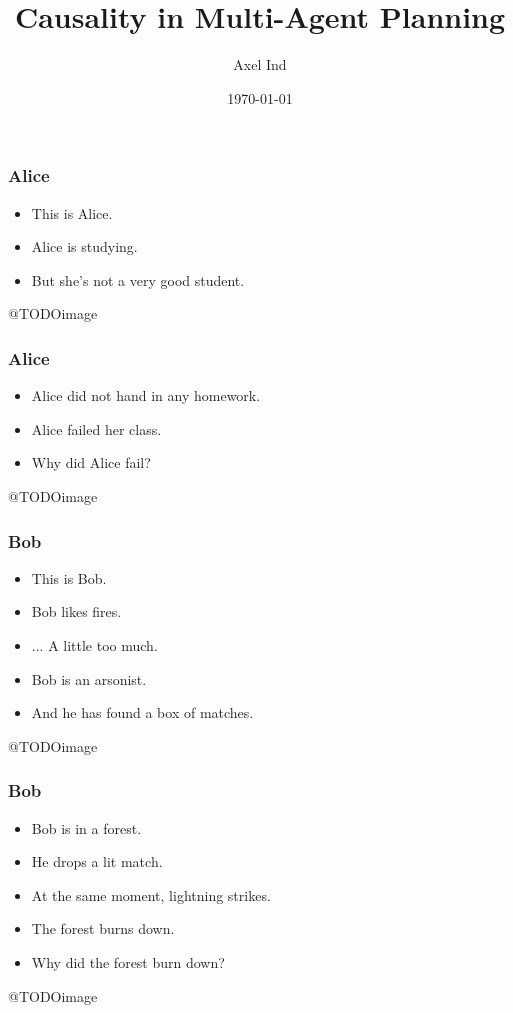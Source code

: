 \documentclass{beamer}
\title{Causality in Multi-Agent Planning}
\author{Axel Ind}
\institute{ALU-Freiburg}
\date{\today}
\theoremstyle{plain}
\theoremstyle{definition}
\begin{document}
 
\frame{\titlepage}

\begin{frame}
\frametitle{Alice}
\begin{itemize}
\item This is Alice.
\item Alice is studying.
\item But she's not a very good student.
\end{itemize}

@TODOimage

\end{frame}



\begin{frame}
\frametitle{Alice}
\begin{itemize}
\item Alice did not hand in any homework.
\item Alice failed her class.
\item Why did Alice fail?
\end{itemize}

@TODOimage

\end{frame}


\begin{frame}
\frametitle{Bob}
\begin{itemize}
\item This is Bob.
\item Bob likes fires.
\item ... A little too much.
\item Bob is an arsonist.
\item And he has found a box of matches.
\end{itemize}

@TODOimage
\end{frame}


\begin{frame}
\frametitle{Bob}
\begin{itemize}
\item Bob is in a forest.
\item He drops a lit match.
\item At the same moment, lightning strikes.
\item The forest burns down.
\item Why did the forest burn down?
\end{itemize}

@TODOimage
\end{frame}
\end{document}
